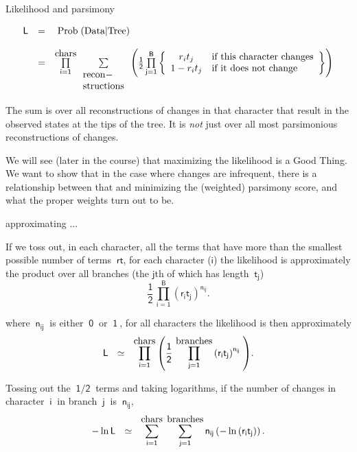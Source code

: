 \documentclass[bluish,slideColor,colorBG,pdf]{prosper}
\def\prob{{\rm \;Prob\;}}
\begin{document}
\begin{slide}[Replace]{Likelihood and parsimony}

\noindent
\hspace*{0.0in}\hspace{-0.3in}\[
\begin{array}{c c  l}
\mathsf{L} & \mathsf{=}  & \prob(\mbox{Data}|\mbox{Tree})\\
  & & \\
  & = & \prod\limits_{\mathsf{i=1}}^{\mbox{$\rm chars$}}
               \sum\limits_{\begin{array}{l}\mbox{$\rm recon-$}\\
                                            \mbox{$\rm structions$}\end{array}}              \left(\mathsf{\frac{1}{2} \prod\limits_{j=1}^B
        \left\{
            \begin{array}{c l}
            r_i t_j &  \mbox{if~this~character~changes}\\
            1 - r_i t_j &  \mbox{if~it~does~not~change}
            \end{array}
         \right\} }\right)
\end{array}
\]
\bigskip

The sum is over all reconstructions of changes in that character that
result in the observed states at the tips of the tree.  It is {\it not} just
over all most parsimonious reconstructions of changes.
\bigskip

We will see (later in the course) that maximizing the likelihood is a Good
Thing.  We want to show that in the case where changes are infrequent,
there is a relationship between that and minimizing the (weighted) parsimony
score, and what the proper weights turn out to be.


\end{slide}

\begin{slide}[Replace]{approximating ... }

\noindent
If we toss out, in each character, all the terms that have more than the
smallest possible number of terms $~\mathsf{r t}$,
for each character ($\mathsf{i}$) the likelihood is approximately the
product over all branches (the $\mathsf{j}$th of which has length $\
\mathsf{t_j}$)
\[
\mathsf{\frac{1}{2}\,\prod_{i=1}^B \left(r_i t_j\right)^{n_{ij}}.}
\]

\noindent
where $\mathsf{~n_{ij}~}$ is either $\mathsf{~0~}$ or $\mathsf{~1~}$,
for all characters the likelihood is then approximately
\[
\mathsf{L\ \ \simeq\ \ \prod_{i=1}^{\mbox{{$\rm chars$}}}\left( \frac{1}{2}\, \prod_{j=1}^{\mbox{$\rm branches$}} \left(r_it_j\right)^{n_{ij}}\;\right)}.
\]

\noindent
Tossing out the $~\mathsf{1/2}~$ terms and taking logarithms, if the number of
changes in character $\ \mathsf{i}\ $ in branch $\ \mathsf{j}\ $ is $\
\mathsf{n_{ij}}$,
\[
\mathsf{- \ln L\ \ \simeq\ \ \sum_{i=1}^{\mbox{$\rm chars$}}\; \sum_{j=1}^{\mbox{$\rm branches$}} n_{ij}\left( - \ln \left(r_it_j\right)\right).}
\]

\end{slide}
\end{document}
